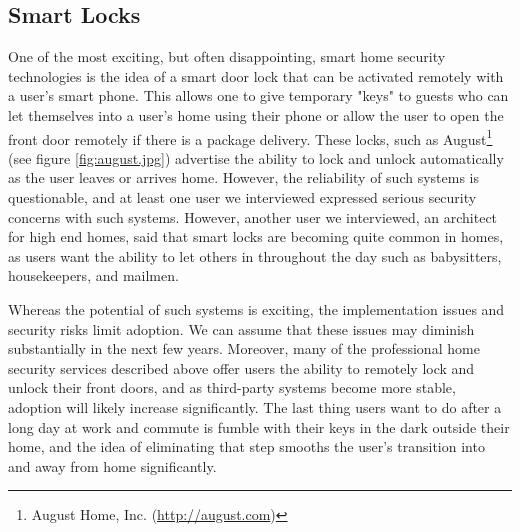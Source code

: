\subsection{Smart Locks}

One of the most exciting, but often disappointing, smart home security technologies is the idea of a smart door lock that can be activated remotely with a user's smart phone. This allows one to give temporary "keys" to guests who can let themselves into a user's home using their phone or allow the user to open the front door remotely if there is a package delivery. These locks, such as August\footnote{August Home, Inc. (\url{http://august.com})} (see figure \ref{fig:august.jpg}) advertise the ability to lock and unlock automatically as the user leaves or arrives home. However, the reliability of such systems is questionable, and at least one user we interviewed expressed serious security concerns with such systems. However, another user we interviewed, an architect for high end homes, said that smart locks are becoming quite common in homes, as users want the ability to let others in throughout the day such as babysitters, housekeepers, and mailmen.

Whereas the potential of such systems is exciting, the implementation issues and security risks limit adoption. We can assume that these issues may diminish substantially in the next few years. Moreover, many of the professional home security services described above offer users the ability to remotely lock and unlock their front doors, and as third-party systems become more stable, adoption will likely increase significantly. The last thing users want to do after a long day at work and commute is fumble with their keys in the dark outside their home, and the idea of eliminating that step smooths the user's transition into and away from home significantly.

